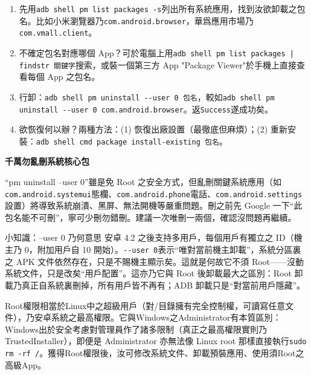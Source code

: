 \begin{enumerate}
  \item 先用\texttt{adb shell pm list packages -\allowbreak s}列出所有系統應用，找到汝欲卸載之包名。比如小米瀏覽器乃\texttt{com.\allowbreak android.\allowbreak browser}，華爲應用市場乃\texttt{com.\allowbreak vmall.\allowbreak client}。
  \item 不確定包名對應哪個 App？可於電腦上用\texttt{adb shell pm list packages | findstr 關鍵字}搜索，或裝一個第三方 App "Package Viewer"於手機上直接查看每個 App 之包名。
  \item 行卸：\texttt{adb shell pm uninstall -\allowbreak -\allowbreak user 0 包名}，較如\texttt{adb shell pm uninstall -\allowbreak -\allowbreak user 0 com.\allowbreak android.\allowbreak browser}。返\texttt{Success}遂成功矣。
  \item 欲恢復何以辦？兩種方法：(1) 恢復出廠設置（最徹底但麻煩）；(2) 重新安裝：\texttt{adb shell cmd package install-\allowbreak existing 包名}。
\end{enumerate}

\textbf{千萬勿亂刪系統核心包}\par

“pm uninstall --user 0”雖是免 Root 之安全方式，但亂刪關鍵系統應用（如\texttt{com.\allowbreak android.\allowbreak systemui}態欄、\texttt{com.\allowbreak android.\allowbreak phone}電話、\texttt{com.\allowbreak android.\allowbreak settings}設置）將導致系統崩潰、黑屏、無法開機等嚴重問題。刪之前先 Google 一下“此包名能不可刪”，寧可少刪勿錯刪。建議一次唯刪一兩個，確認沒問題再繼續。

\begin{tcbinfo}{小知識：--user 0 乃何意思}
安卓 4.2 之後支持多用戶，每個用戶有獨立之 ID（機主乃 0，附加用戶自 10 開始）。\texttt{-\allowbreak -\allowbreak user 0}表示“唯對當前機主卸載”，系統分區裏之 APK 文件依然存在，只是不賜機主顯示矣。這就是何故它不須 Root——沒動系統文件，只是改矣“用戶配置”。這亦乃它與 Root 後卸載最大之區別：Root 卸載乃真正自系統裏刪掉，所有用戶皆不再有；ADB 卸載只是“對當前用戶隱藏”。

\end{tcbinfo}


Root權限相當於Linux中之超級用戶（對/目錄擁有完全控制權，可讀寫任意文件），乃安卓系統之最高權限。它與Windows之Administrator有本質區別：Windows出於安全考慮對管理員作了諸多限制（真正之最高權限實則乃 TrustedInstaller），即便是 Administrator 亦無法像 Linux root 那樣直接執行\texttt{sudo rm -\allowbreak rf /\allowbreak *}。獲得Root權限後，汝可修改系統文件、卸載預裝應用、使用須Root之高級App。

